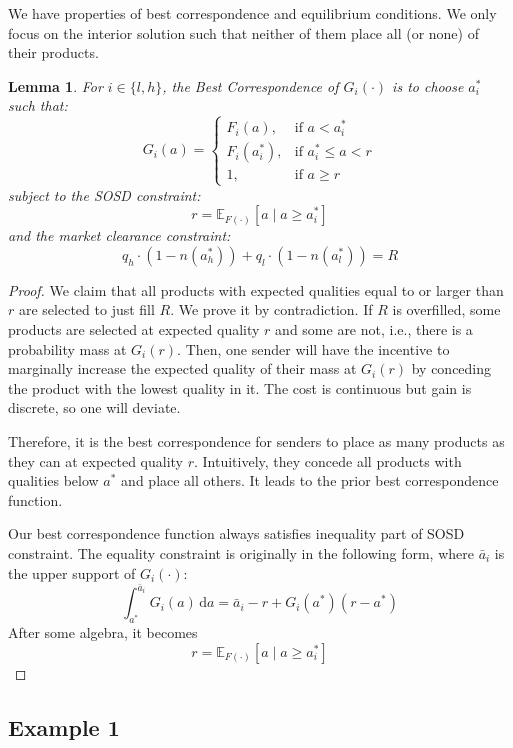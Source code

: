 \documentclass[12pt, a4paper]{article}
\newtheorem{lemma}{Lemma}
\begin{document}
We have properties of best correspondence and equilibrium conditions. We only focus on the interior solution such that neither of them place all (or none) of their products.  


\begin{lemma}
\label{Lemma: Equilibrium of Subgame}
    For $i \in \{l,h\}$, the Best Correspondence of $G_i(\cdot)$ is to choose $a_i^*$ such that:
    \[
        G_i(a) = 
        \begin{cases}
            F_i(a), & \text{if } a < a_i^* \\
            F_i(a^*_i), & \text{if } a_i^* \leq a < r \\
            1, & \text{if } a \geq r
        \end{cases}
    \]
    subject to the SOSD constraint:
      \[
        r = \mathbb{E}_{F(\cdot)}[a \mid a \geq a^*_i]
    \]
    and the market clearance constraint:
    \[
        q_h \cdot (1-n(a^*_h)) + q_l \cdot (1-n(a^*_l)) = R
    \]
\end{lemma}

\begin{proof}
    We claim that all products with expected qualities equal to or larger than $r$ are selected to just fill $R$. We prove it by contradiction. If $R$ is overfilled, some products are selected at expected quality $r$ and some are not, i.e., there is a probability mass at $G_i(r)$. Then, one sender will have the incentive to marginally increase the expected quality of their mass at $G_i(r)$ by conceding the product with the lowest quality in it. The cost is continuous but gain is discrete, so one will deviate. 

    Therefore, it is the best correspondence for senders to place as many products as they can at expected quality $r$. Intuitively, they concede all products with qualities below $a^*$ and place all others. It leads to the prior best correspondence function. 

    Our best correspondence function always satisfies inequality part of SOSD constraint. The equality constraint is originally in the following form, where $\bar{a}_i$ is the upper support of $G_i(\cdot)$:
    \[
        \int_{a^*}^{\bar{a}_i} G_i(a) \, \mathrm{d}a = \bar{a}_i - r + G_i(a^*)(r-a^*)
    \]
    After some algebra, it becomes
    \[
        r = \mathbb{E}_{F(\cdot)}[a \mid a \geq a^*_i]
    \]
\end{proof}


\subsection{Example 1}
\end{document}
